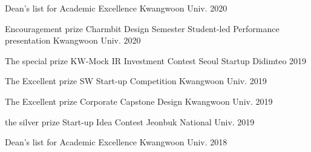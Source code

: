 

\cvsubsection{\textcolor{red}{\\Awards}}


\begin{cvhonors}

  \cvhonor
    {Dean's list} %
    {for Academic Excellence} %
    {Kwangwoon Univ.} %
    {2020} %

  \cvhonor
    {Encouragement prize} %
    {Charmbit Design Semester Student-led Performance presentation} %
    {Kwangwoon Univ.} %
    {2020} %

  \cvhonor
    {The special prize} %
    {KW-Mock IR Investment Contest} %
    {Seoul Startup Didimteo} %
    {2019} %

  \cvhonor
    {The Excellent prize} %
    {SW Start-up Competition} %
    {Kwangwoon Univ.} %
    {2019} %

  \cvhonor
    {The Excellent prize} %
    {Corporate Capstone Design} %
    {Kwangwoon Univ.} %
    {2019} %

  \cvhonor
    {the silver prize} %
    {Start-up Idea Contest} %
    {Jeonbuk National Univ.} %
    {2019} %

  \cvhonor
    {Dean's list} %
    {for Academic Excellence} %
    {Kwangwoon Univ.} %
    {2018} %
\end{cvhonors}


